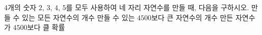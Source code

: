 4개의 숫자 $2$, $3$, $4$, $5$를 모두 사용하여 네 자리 자연수를 만들 때, 다음을 구하시오.
 만들 수 있는 모든 자연수의 개수
 만들 수 있는 $4500$보다 큰 자연수의 개수
 만든 자연수가 $4500$보다 클 확률
